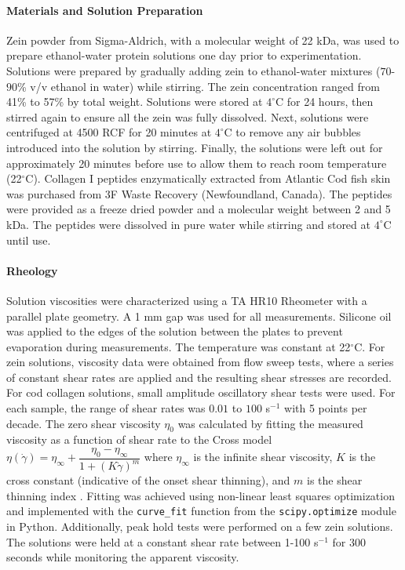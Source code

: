 \documentclass[lineno]{JFM-FLM_Au}
\begin{document}
\paragraph*{Materials and Solution Preparation}
Zein powder from Sigma-Aldrich, with a molecular weight of 22 kDa, was used to prepare ethanol-water protein solutions one day prior to experimentation. Solutions were prepared by gradually adding zein to ethanol-water mixtures ($70$-$90$\% v/v ethanol in water) while stirring. The zein concentration ranged from 41\% to 57\% by total weight. Solutions were stored at $4^\circ$C for 24 hours, then stirred again to ensure all the zein was fully dissolved. Next, solutions were centrifuged at 4500 RCF for 20 minutes at $4^\circ$C to remove any air bubbles introduced into the solution by stirring. Finally, the solutions were left out for approximately 20 minutes before use to allow them to reach room temperature (22$^\circ$C). Collagen I peptides enzymatically extracted from Atlantic Cod fish skin was purchased from 3F Waste Recovery (Newfoundland, Canada). The peptides were provided as a freeze dried powder and a molecular weight between 2 and 5 kDa. The peptides were dissolved in pure water while stirring and stored at $4^\circ$C until use.

\paragraph*{Rheology}
Solution viscosities were characterized using a TA HR10 Rheometer with a parallel plate geometry. A 1 mm gap was used for all measurements. Silicone oil was applied to the edges of the solution between the plates to prevent evaporation during measurements. The temperature was constant at 22$^\circ$C. For zein solutions, viscosity data were obtained from flow sweep tests, where a series of constant shear rates are applied and the resulting shear stresses are recorded. For cod collagen solutions, small amplitude oscillatory shear tests were used. For each sample, the range of shear rates was $0.01$ to $100$ s$^{-1}$ with 5 points per decade. The zero shear viscosity $\eta_0$ was calculated by fitting the measured viscosity as a function of shear rate to the Cross model $\eta(\dot{\gamma}) = \eta_{\infty} + \dfrac{\eta_0 - \eta_{\infty}}{1 + (K\dot{\gamma})^m}$ where $\eta_\infty$ is the infinite shear viscosity, $K$ is the cross constant (indicative of the onset shear thinning), and $m$ is the shear thinning index \cite{barnes_handbook_2000}. Fitting was achieved using non-linear least squares optimization and implemented with the \texttt{curve\_fit} function from the \texttt{scipy.optimize} module in Python. Additionally, peak hold tests were performed on a few zein solutions. The solutions were held at a constant shear rate between 1-100 s$^{-1}$ for 300 seconds while monitoring the apparent viscosity.
\end{document}
